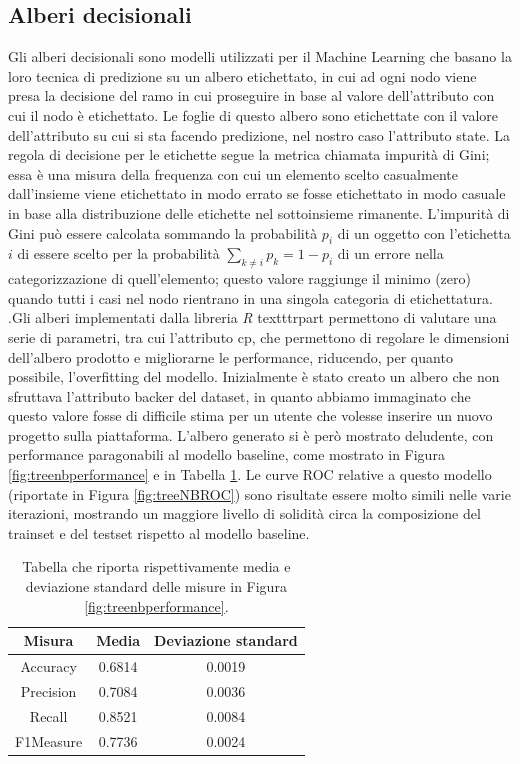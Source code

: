 \subsection{Alberi decisionali}
Gli alberi decisionali sono modelli utilizzati per il Machine Learning che basano la loro tecnica di predizione su un albero etichettato, in cui ad ogni nodo viene presa la decisione del ramo in cui proseguire in base al valore dell'attributo con cui il nodo è etichettato. Le foglie di questo albero sono etichettate con il valore dell'attributo su cui si sta facendo predizione, nel nostro caso l'attributo state. La regola di decisione per le etichette segue la metrica chiamata impurità di Gini; essa è una misura della frequenza con cui un elemento scelto casualmente dall'insieme viene etichettato in modo errato se fosse etichettato in modo casuale in base alla distribuzione delle etichette nel sottoinsieme rimanente. L'impurità di Gini può essere calcolata sommando la probabilità $p_i$ di un oggetto con l'etichetta $i$ di essere scelto per la probabilità $ \sum\limits_{k\neq i} p_{k}=1-p_{i} $ di un errore nella categorizzazione di quell'elemento; questo valore raggiunge il minimo (zero) quando tutti i casi nel nodo rientrano in una singola categoria di etichettatura. .Gli alberi implementati dalla libreria \emph{R} texttt{rpart} permettono di valutare una serie di parametri, tra cui l'attributo cp, che permettono di regolare le dimensioni dell'albero prodotto e migliorarne le performance, riducendo, per quanto possibile, l'overfitting del modello.
Inizialmente è stato creato un albero che non sfruttava l'attributo backer del dataset, in quanto abbiamo immaginato che questo valore fosse di difficile stima per un utente che volesse inserire un nuovo progetto sulla piattaforma. L'albero generato si è però mostrato deludente, con performance paragonabili al modello baseline, come mostrato in Figura \ref{fig:treenbperformance} e in Tabella \ref{tab:treenbperformance}.
Le curve ROC relative a questo modello (riportate in Figura \ref{fig:treeNBROC}) sono risultate essere molto simili nelle varie iterazioni, mostrando un maggiore livello di solidità circa la composizione del trainset e del testset rispetto al modello baseline.
\begin{table}[h!]
	\caption{Tabella che riporta rispettivamente media e deviazione standard delle misure in Figura \ref{fig:treenbperformance}.}
	\label{tab:treenbperformance}
	\centering
	\begin{tabular}{c|cc}
		Misura & Media & Deviazione standard \\
		\hline
		Accuracy & 0.6814 & 0.0019 \\ 
		Precision & 0.7084 & 0.0036 \\
		Recall & 0.8521 & 0.0084 \\
		F1Measure & 0.7736 & 0.0024 \\
	\end{tabular}
\end{table}
